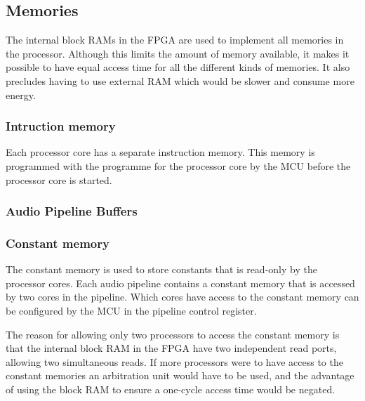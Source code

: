 \subsection{Memories}\label{sec:fpga-memories}

The internal block RAMs in the FPGA are used to implement all memories in the processor.
Although this limits the amount of memory available, it makes it possible to have
equal access time for all the different kinds of memories. It also precludes having
to use external RAM which would be slower and consume more energy.

\subsubsection{Intruction memory}

Each processor core has a separate instruction memory. This memory is programmed
with the programme for the processor core by the MCU before the processor core is
started.

\subsubsection{Audio Pipeline Buffers}

\subsubsection{Constant memory}

The constant memory is used to store constants that is read-only by the processor
cores. Each audio pipeline contains a constant memory that is accessed by two
cores in the pipeline. Which cores have access to the constant memory can be
configured by the MCU in the pipeline control register.

The reason for allowing only two processors to access the constant memory is
that the internal block RAM in the FPGA have two independent read ports, allowing
two simultaneous reads. If more processors were to have access to the constant
memories an arbitration unit would have to be used, and the advantage of using
the block RAM to ensure a one-cycle access time would be negated.

